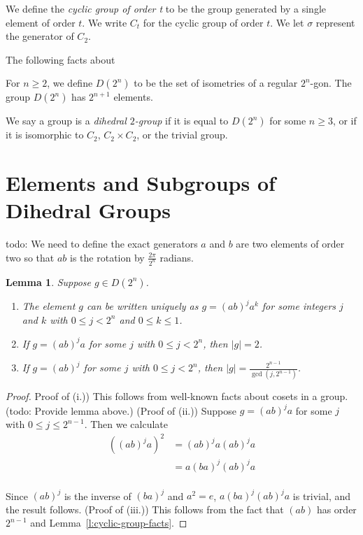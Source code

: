 \documentclass{amsart}
\numberwithin{equation} {section}
\newtheorem{lemma}[equation]{Lemma}
\theoremstyle{definition}
\begin{document}
We define the \textit{cyclic group of order t} to be the group generated by a single element of order $t$. We write $C_t$ for the cyclic group of order $t$. We let $\sigma$ represent the generator of $C_2$. 

The following facts about 

For $n \geq 2$, we define $D(2^n)$ to be the set of isometries of a regular $2^n$-gon. The group $D(2^n)$ has $2^{n+1}$ elements. 

We say a group is a  \textit{dihedral $2$-group} if it is equal to $D(2^n)$ for some $n \geq 3$, or if it is isomorphic to $C_2$, $C_2 \times C_2$, or the trivial group. 


\section{Elements and Subgroups of Dihedral Groups}

todo: We need to define the exact generators $a$ and $b$ are two elements of order two so that $ab$ is the rotation by $\displaystyle\frac{2\pi}{2^n}$ radians. 


\begin{lemma}\label{l:normal-form}
Suppose $g \in D(2^n)$. 
\begin{enumerate}
\item[(i.)] The element $g$ can be written uniquely as $g = (ab)^ja^k$ for some integers $j$ and $k$ with $0 \leq j < 2^{n}$ and $0 \leq k \leq 1$. 
\item[(ii.)] If $g = (ab)^ja$ for some $j$ with $0 \leq j < 2^{n}$, then $|g| = 2$. 
\item[(iii.)] If $g = (ab)^j$ for some $j$ with $0 \leq j < 2^{n}$, then $|g| = \displaystyle\frac{2^{n-1}}{\gcd(j,2^{n-1})}$. 
\end{enumerate}
\end{lemma}

\begin{proof}
Proof of (i.)) This follows from well-known facts about cosets in a group. (todo: Provide lemma above.) 
(Proof of (ii.)) Suppose $g = (ab)^ja$ for some $j$ with $0 \leq j \leq 2^{n-1}$. Then we calculate
\begin{align*}
((ab)^j a)^2 &= (ab)^j a (ab)^j a \\
&= a (ba)^j (ab)^j a \\
\end{align*}

Since $(ab)^j$ is the inverse of $(ba)^j$ and $a^2 = e$,  $a (ba)^j (ab)^j a$ is trivial, and the result follows. (Proof of (iii.)) This follows from the fact that $(ab)$ has order $2^{n-1}$ and Lemma~\ref{l:cyclic-group-facts}.
\end{proof}
\end{document}
